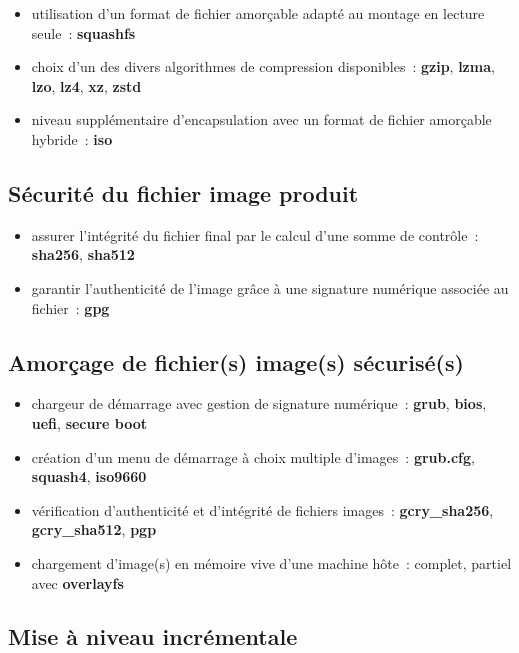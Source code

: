 \documentclass[10pt]{article}
\newenvironment{itmz}{\begin{itemize}
\setlength{\itemsep}{0em}
}{\end{itemize}}
\begin{document}
\begin{itmz}
\item{utilisation d’un format de fichier amorçable adapté au montage en lecture seule : \textbf{squashfs}}
\item{choix d’un des divers algorithmes de compression disponibles : \textbf{gzip}, \textbf{lzma}, \textbf{lzo}, \textbf{lz4}, \textbf{xz}, \textbf{zstd}}
\item{niveau supplémentaire d’encapsulation avec un format de fichier amorçable hybride : \textbf{iso}}
\end{itmz}

\subsection{Sécurité du fichier image produit}

\begin{itmz}
\item{assurer l’intégrité du fichier final par le calcul d’une somme de contrôle : \textbf{sha256}, \textbf{sha512}}
\item{garantir l’authenticité de l’image grâce à une signature numérique associée au fichier : \textbf{gpg}}
\end{itmz}

\subsection{Amorçage de fichier(s) image(s) sécurisé(s)}

\begin{itmz}
\item{chargeur de démarrage avec gestion de signature numérique : \textbf{grub}, \textbf{bios}, \textbf{uefi}, \textbf{secure boot}}
\item{création d’un menu de démarrage à choix multiple d’images : \textbf{grub.cfg}, \textbf{squash4}, \textbf{iso9660}}
\item{vérification d’authenticité et d’intégrité de fichiers images : \textbf{gcry\_sha256}, \textbf{gcry\_sha512}, \textbf{pgp}}
\item{chargement d’image(s) en mémoire vive d’une machine hôte : complet, partiel avec \textbf{overlayfs}}
\end{itmz}

\subsection{Mise à niveau incrémentale}
\end{document}
